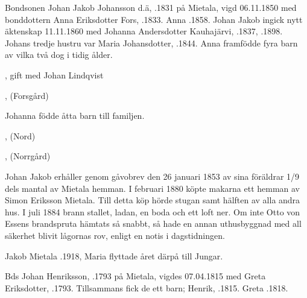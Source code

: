 Bondsonen Johan Jakob Johansson d.ä, .1831 på Mietala, vigd 06.11.1850 med bonddottern Anna Eriksdotter Fors, .1833. Anna .1858. Johan Jakob ingick nytt äktenskap 11.11.1860 med Johanna Andersdotter Kauhajärvi, .1837, .1898. Johans tredje hustru var Maria Johansdotter,  .1844.
Anna framfödde fyra barn av vilka två dog i tidig ålder.
\begin{jhchildren}
  \item {}, gift med Johan Lindqvist
  \item {}, (Forsgård)
  \item {}
  \item {}
\end{jhchildren}

Johanna födde åtta barn till familjen.
\begin{jhchildren}
  \item {}, (Nord)
  \item {}
  \item {}
  \item {}
  \item {}
  \item {}
  \item {}, (Norrgård)
  \item {}
\end{jhchildren}
Johan Jakob erhåller genom gåvobrev den 26 januari 1853 av sina föräldrar 1/9 dels mantal av Mietala hemman. I februari 1880 köpte makarna ett hemman av Simon Eriksson Mietala. Till detta köp hörde stugan samt hälften av alla andra hus. I juli 1884 brann stallet, ladan, en boda och ett loft ner. Om inte Otto von Essens brandspruta hämtats så snabbt, så hade en annan uthusbyggnad med all säkerhet blivit lågornas rov, enligt en notis i dagstidningen.

Jakob Mietala .1918, Maria flyttade året därpå till Jungar.


Bds Johan Henriksson, .1793 på Mietala, vigdes 07.04.1815 med Greta Eriksdotter, .1793. Tillsammans fick de ett barn; Henrik, .1815.
Greta .1818.

